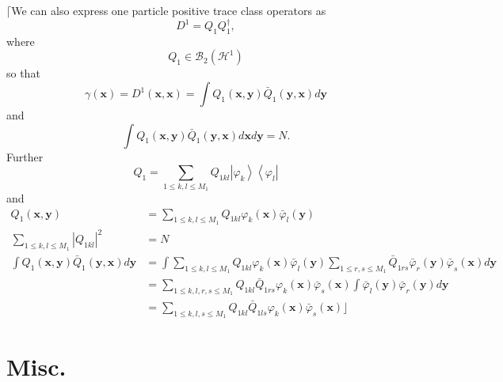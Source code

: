\documentclass[aps,preprint]{revtex4}%
\begin{document}
$\lceil$We can also express one particle positive trace class operators as
\begin{equation}
D^{1}=Q_{1}Q_{1}^{\dagger},
\end{equation}
where
\begin{equation}
Q_{1}\in\mathcal{B}_{2}\left(  \mathcal{H}^{1}\right)
\end{equation}
so that
\begin{equation}
\gamma\left(  \mathbf{x}\right)  =D^{1}\left(  \mathbf{x,x}\right)  =\int
Q_{1}\left(  \mathbf{x,y}\right)  \bar{Q}_{1}\left(  \mathbf{y,x}\right)
d\mathbf{y}%
\end{equation}
and
\begin{equation}
\int Q_{1}\left(  \mathbf{x,y}\right)  \bar{Q}_{1}\left(  \mathbf{y,x}\right)
d\mathbf{x}d\mathbf{y}=N\mathbf{.}%
\end{equation}
Further
\begin{equation}
Q_{1}=\sum_{1\leq k,l\leq M_{1}}Q_{1kl}\left\vert \varphi_{k}\right\rangle
\left\langle \varphi_{l}\right\vert
\end{equation}
and
\begin{align}
Q_{1}\left(  \mathbf{x,y}\right)   &  =\sum_{1\leq k,l\leq M_{1}}%
Q_{1kl}\varphi_{k}\left(  \mathbf{x}\right)  \bar{\varphi}_{l}\left(
\mathbf{y}\right) \\
\sum_{1\leq k,l\leq M_{1}}\left\vert Q_{1kl}\right\vert ^{2}  &  =N\nonumber\\
\int Q_{1}\left(  \mathbf{x,y}\right)  \bar{Q}_{1}\left(  \mathbf{y,x}\right)
d\mathbf{y}  &  \mathbf{=}\int\sum_{1\leq k,l\leq M_{1}}Q_{1kl}\varphi
_{k}\left(  \mathbf{x}\right)  \bar{\varphi}_{l}\left(  \mathbf{y}\right)
\sum_{1\leq r,s\leq M_{1}}\bar{Q}_{1rs}\bar{\varphi}_{r}\left(  \mathbf{y}%
\right)  \bar{\varphi}_{s}\left(  \mathbf{x}\right)  d\mathbf{y}\\
&  =\sum_{1\leq k,l,r,s\leq M_{1}}Q_{1kl}\bar{Q}_{1rs}\varphi_{k}\left(
\mathbf{x}\right)  \bar{\varphi}_{s}\left(  \mathbf{x}\right)  \int
\bar{\varphi}_{l}\left(  \mathbf{y}\right)  \bar{\varphi}_{r}\left(
\mathbf{y}\right)  d\mathbf{y}\\
&  =\sum_{1\leq k,l,s\leq M_{1}}Q_{1kl}\bar{Q}_{1ls}\varphi_{k}\left(
\mathbf{x}\right)  \bar{\varphi}_{s}\left(  \mathbf{x}\right)  \rfloor
\end{align}


\section{Misc.}
\end{document}
